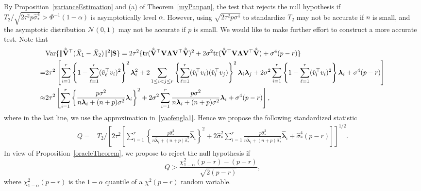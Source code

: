 \documentclass[times,sort&compress,3p]{elsarticle}
\newcommand{\mytr}{ {\rm tr} }
\newcommand{\myVar}{ {\rm Var} }
\newcommand{\bfsym}[1]{\ensuremath{\boldsymbol{#1}}}
\def\blambda {\bfsym {\lambda}}        \def\bLambda {\bfsym {\Lambda}}
\theoremstyle{plain}
\theoremstyle{definition}
\theoremstyle{remark}
\begin{document}
By Proposition~\ref{varianceEstimation} and (a) of Theorem~\ref{myPanpan}, the test that rejects the null hypothesis if
$
T_2/\sqrt{2\tau^2 p\hat{\sigma}^4_*}>\Phi^{-1}(1-\alpha)
$
is asymptotically level $\alpha$.
However, using $\sqrt{2\tau^2 p\sigma^4}$ to standardize $T_2$ may not be accurate if $n$ is small, and the asymptotic distribution $\mathcal{N}(0,1)$ may not be accurate if $p$ is small.
We would like to make further effort to construct a more accurate test.
Note that
\begin{align*}
    &\myVar\{
\|\hat{\tilde{\BV}}^\top  (\bar{X}_1-\bar{X}_2)\|^2
| \BS
\}
    =2\tau^2 \{
\mytr(\hat{\tilde{\BV}}^\top  \BV \bLambda \BV^\top \hat{\tilde{\BV}})^2
+
2\sigma^2\mytr(\hat{\tilde{\BV}}^\top  \BV \bLambda \BV^\top \hat{\tilde{\BV}})
+\sigma^4 (p-r)
\}
\\
    =&
    2\tau^2\left[
        \sum_{i=1}^r \left\{1-\sum_{\ell=1}^r (\hat{v}_\ell^\top  v_i)^2\right\}^2 \blambda_i^2
        +2\sum_{1\leq i<j \leq r}\left\{\sum_{\ell=1}^r (\hat{v}_l^\top  v_i)(\hat{v}_l^\top  v_j )\right\}^2\blambda_i\blambda_j
    +
    2\sigma^2\sum_{i=1}^r \left\{ 1-\sum_{\ell=1}^r (\hat{v}_l^\top  v_i)^2\right\} \blambda_i
    +\sigma^4 (p-r)
\right]
    \\
    \approx&
    2\tau^2\left[
        \sum_{i=1}^r \left\{\frac{p\sigma^2}{n\blambda_i+(n+p)\sigma^2}\blambda_i\right\}^2
    +
    2\sigma^2\sum_{i=1}^r \frac{p\sigma^2}{n\blambda_i+(n+p)\sigma^2}\blambda_i
    +\sigma^4 (p-r)
\right],
\end{align*}
where in the last line, we use the approximation in~\eqref{yaofengla1}.
Hence we propose the following standardized statistic
    \begin{align*}
        Q=&T_2\bigg/
   \left[ 
        2\tau^2\left[
            \sum_{i=1}^r \left\{\frac{p\hat{\sigma}_*^2}{n\hat{\blambda}_i+(n+p)\hat{\sigma}_*^2}\hat{\blambda}_i\right\}^2
    +
        2\hat{\sigma}_*^2\sum_{i=1}^r \frac{p\hat{\sigma}_*^2}{n\hat{\blambda}_i+(n+p)\hat{\sigma}_*^2}\hat{\blambda}_i
        +\hat{\sigma}_*^4 (p-r)
\right]\right]^{1/2}.
    \end{align*}
In view of Proposition~\ref{oracleTheorem}, we propose to reject the null hypothesis if
$$
        Q>\frac{\chi^2_{1-\alpha}(p-r)-(p-r)}{\sqrt{2(p-r)}},
$$
where $\chi^2_{1-\alpha} (p-r)$ is the $1-\alpha$ quantile of a $\chi^2(p-r)$ random variable.
\end{document}
